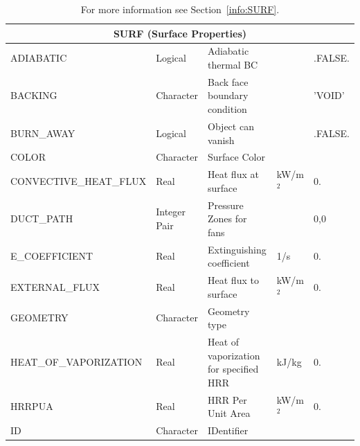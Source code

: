 \documentclass[11pt]{book}
\begin{document}
\begin{longtable}{|l|l|l|l|l|}
\caption[  ]{For more information see Section~\ref{info:SURF}.}
\label{tbl:SURF} \\
\hline
\multicolumn{5}{|c|}{{\ct SURF} (Surface Properties)} \\ \hline \hline
{\ct ADIABATIC}                       & Logical         & Adiabatic thermal BC              &                     & {\ct .FALSE.}           \\ \hline
{\ct BACKING}                         & Character       & Back face boundary condition      &                     & {\ct 'VOID'}            \\ \hline
{\ct BURN\_AWAY}                      & Logical         & Object can vanish                 &                     & {\ct .FALSE.}           \\ \hline
{\ct COLOR    }                       & Character       & Surface Color                     &                     &                         \\ \hline
{\ct CONVECTIVE\_HEAT\_FLUX}          & Real            & Heat flux at surface              & kW/m$^2$            & 0.                      \\ \hline
{\ct DUCT\_PATH}                      & Integer Pair    & Pressure Zones for fans           &                     & 0,0                     \\ \hline
{\ct E\_COEFFICIENT}                  & Real            & Extinguishing coefficient         & 1/s                 & 0.                      \\ \hline
{\ct EXTERNAL\_FLUX}                  & Real            & Heat flux to surface              & kW/m$^2$            & 0.                      \\ \hline
{\ct GEOMETRY}                        & Character       & Geometry type                     &                     &                         \\ \hline
{\ct HEAT\_OF\_VAPORIZATION }         & Real            & Heat of vaporization for specified HRR & kJ/kg          & 0.                      \\ \hline
{\ct HRRPUA }                         & Real            & HRR Per Unit Area                 & kW/m$^2$            & 0.                      \\ \hline
{\ct ID     }                         & Character       & IDentifier                        &                     &                         \\ \hline

\end{longtable}
\end{document}
